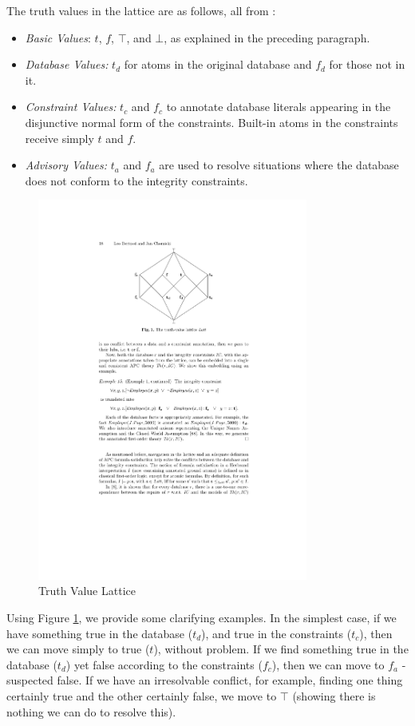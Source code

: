 The truth values in the lattice are as follows, all from \cite{CQ}:

\begin{itemize}
\item \textit{Basic Values}: $t$, $f$, $\top$, and $\bot$, as explained in the preceding paragraph. 
\item \textit{Database Values:} $t_d$ for atoms in the original database and $f_d$ for those not in it.
\item \textit{Constraint Values:} $t_c$ and $f_c$ to annotate database literals appearing in the disjunctive normal form of the constraints. Built-in atoms in the constraints receive simply $t$ and $f$.
\item \textit{Advisory Values:} $t_a$ and $f_a$ are used to resolve situations where the database does not conform to the integrity constraints. 
\end{itemize}

\begin{figure}[!h]
  \centering \includegraphics[width=3.5in]{images/TruthLattice.pdf}
  \caption[Truth Value Lattice]{Truth Value Lattice \cite{CQ}}
  \label{TruthLattice}
\end{figure}


Using Figure \ref{TruthLattice}, we provide some clarifying examples. In the simplest case, if we have something true in the database ($t_d$), and true in the constraints ($t_c$), then we can move simply to true ($t$), without problem. If we find something true in the database ($t_d$) yet false according to the constraints ($f_c$), then we can move to $f_a$ - suspected false. If we have an irresolvable conflict, for example, finding one thing certainly true and the other certainly false, we move to $\top$ (showing there is nothing we can do to resolve this).

